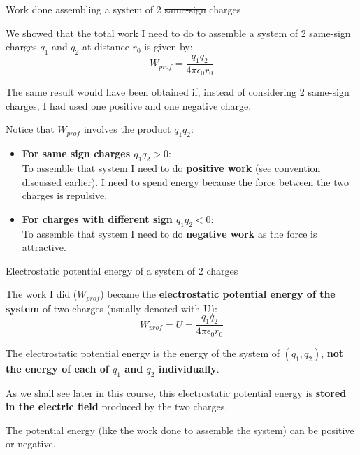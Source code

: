 %
%
%

\begin{frame}{Work done assembling a system of 2 \st{same-sign} charges}

We showed that the total work I need to do to assemble a system of 2 same-sign
charges $q_1$ and $q_2$ at distance $r_0$ is given by:
\begin{equation*}
  W_{prof} = \frac{q_1 q_2}{4\pi\epsilon_0 r_0}
\end{equation*}

The same result would have been obtained if, instead of considering 2 same-sign charges,
I had used one positive and one negative charge.\\

\vspace{0.2cm}

Notice that $W_{prof}$ involves the product $q_1 q_2$:

\begin{itemize}
   \item {\bf For same sign charges $q_1 q_2 > 0$}: \\
         To assemble that system I need to do {\bf positive work} (see convention discussed earlier).
         I need to spend energy because the force between the two charges is repulsive.
   \item {\bf For charges with different sign $q_1 q_2 < 0$}: \\
         To assemble that system I need to do {\bf negative work} as the force is attractive.
\end{itemize}

\end{frame}


%
%
%

\begin{frame}{Electrostatic potential energy of a system of 2 charges}

\vspace{0.1cm}
The work I did ($W_{prof}$) became the {\bf electrostatic potential energy of the system}
of two charges (usually denoted with U):
\begin{equation*}
  W_{prof} = U = \frac{q_1 q_2}{4\pi\epsilon_0 r_0}
\end{equation*}

\vspace{0.2cm}

\begin{itemize}
{
 \item
 The electrostatic potential energy is the energy of the system of $(q_1, q_2)$,
 {\bf not the energy of each of $q_1$ and $q_2$ individually}.\\

 \item
 As we shall see later in this course, this electrostatic potential energy is
 {\bf stored in the electric field} produced by the two charges.\\

 \item
 The potential energy (like the work done to assemble the system) can be positive or negative.
}
\end{itemize}

\end{frame}

